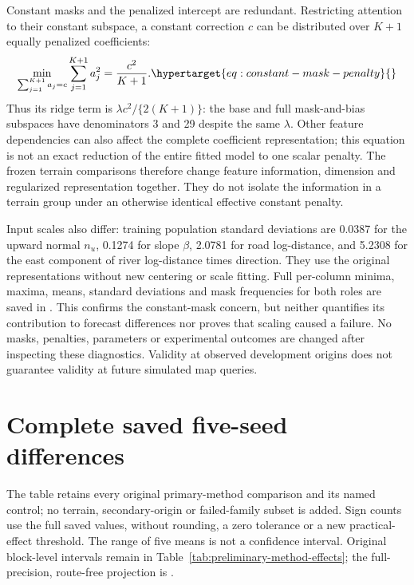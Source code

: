 Constant masks and the penalized intercept are redundant. Restricting
attention to their constant subspace, a constant correction \(c\) can be
distributed over \(K+1\) equally penalized coefficients:
\begin{equation}
 \min_{\sum_{j=1}^{K+1}a_j=c}\sum_{j=1}^{K+1}a_j^2
      =\frac{c^2}{K+1}.
 \label{eq:constant-mask-penalty}\hypertarget{eq:constant-mask-penalty}{}
\end{equation}
Thus its ridge term is \(\lambda c^2/\{2(K+1)\}\): the base and full
mask-and-bias subspaces have denominators 3 and 29 despite the same
\(\lambda\). Other feature dependencies can also affect the complete
coefficient representation; this equation is not an exact reduction of the
entire fitted model to one scalar penalty. The frozen terrain comparisons
therefore change feature information, dimension and regularized
representation together. They do not isolate the information in a terrain
group under an otherwise identical effective constant penalty.

Input scales also differ: training population standard deviations are
0.0387 for the upward normal \(n_u\), 0.1274 for slope \(\beta\), 2.0781
for road log-distance, and 5.2308 for the east component of river
log-distance times direction. They use the original representations without
new centering or scale fitting. Full per-column minima, maxima, means,
standard deviations and mask frequencies for both roles are saved in
. This confirms the
constant-mask concern, but neither quantifies its contribution to forecast
differences nor proves that scaling caused a failure. No masks, penalties,
parameters or experimental outcomes are changed after inspecting these
diagnostics. Validity at observed development origins does not guarantee
validity at future simulated map queries.


\section{Complete saved five-seed differences}
\label{sec:method-seed-table}\hypertarget{sec:method-seed-table}{}
The table retains every original primary-method comparison and its named
control; no terrain, secondary-origin or failed-family subset is added.
Sign counts use the full saved values, without rounding, a zero tolerance
or a new practical-effect threshold. The range of five means is not a
confidence interval. Original block-level intervals remain in
Table~\ref{tab:preliminary-method-effects}; the full-precision, route-free
projection is .


